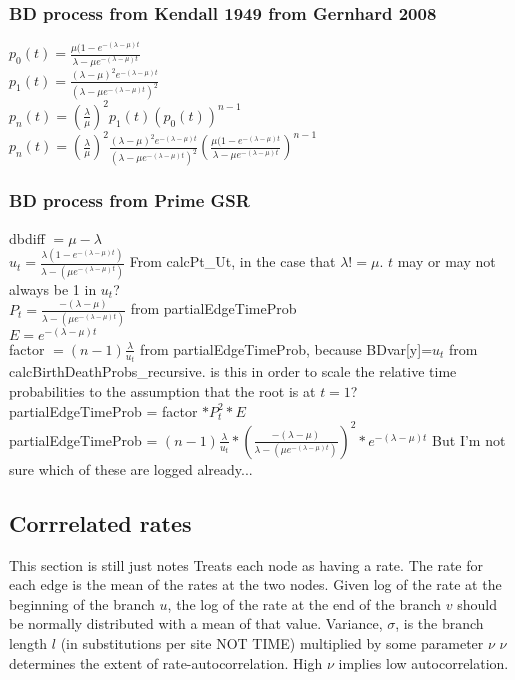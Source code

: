 \documentclass{llncs}
\newcommand{\ejmcomment}[1]{{\color{green} #1}}
\begin{document}
\subsubsection{BD process from Kendall 1949 from Gernhard 2008\\}

$p_0(t)=\frac{\mu(1-e^{-(\lambda-\mu)t}}{\lambda-\mu e^{-(\lambda-\mu)t}}$\\
$p_1(t)=\frac{(\lambda-\mu)^2e^{-(\lambda-\mu)t}}{(\lambda-\mu e^{-(\lambda-\mu)t})^2}$\\
$p_n(t)=(\frac{\lambda}{\mu})^2p_1(t)(p_0(t))^{n-1}$\\
$p_n(t)=(\frac{\lambda}{\mu})^2\frac{(\lambda-\mu)^2e^{-(\lambda-\mu)t}}{(\lambda-\mu e^{-(\lambda-\mu)t})^2}(\frac{\mu(1-e^{-(\lambda-\mu)t}}{\lambda-\mu e^{-(\lambda-\mu)t}})^{n-1}$\\

\subsubsection{BD process from Prime GSR\\}

dbdiff $= \mu - \lambda$\\
$u_t =\frac{\lambda(1-e^{-(\lambda-\mu)t})}{\lambda-(\mu e^{-(\lambda - \mu)t})}$ From calcPt\_Ut, in the case that $\lambda != \mu$. \ejmcomment{$t$ may or may not always be 1 in $u_t$?}\\
$P_t = \frac{-(\lambda-\mu)}{\lambda-(\mu e^{-(\lambda - \mu)t})}$ from partialEdgeTimeProb\\
$E=e^{-(\lambda-\mu)t}$\\
factor $= (n-1)\frac{\lambda}{u_t}$ from partialEdgeTimeProb, because BDvar[y]=$u_t$ from calcBirthDeathProbs\_recursive. 
\ejmcomment{is this in order to scale the relative time probabilities to the assumption that the root is at $t=1$?}\\
partialEdgeTimeProb = factor $*P_t^2 *E$\\
partialEdgeTimeProb = $(n-1)\frac{\lambda}{u_t} * ( \frac{-(\lambda-\mu)}{\lambda-(\mu e^{-(\lambda - \mu)t})})^2 * e^{-(\lambda-\mu)t}$\ejmcomment{But I'm not sure which of these are logged already...}\\

\subsection{Corrrelated rates \cite{Kishino2001}}\ejmcomment{This section is still just notes}
Treats each node as having a rate.
The rate for each edge is the mean of the rates at the two nodes.
Given log  of the rate at the beginning of the branch $u$, the log of the rate at the end of the branch $v$ should be normally distributed with a mean of that value.
Variance, $\sigma$, is the branch length $l$ (in substitutions per site NOT TIME) multiplied by some parameter $\nu$
$\nu$ determines the extent of rate-autocorrelation. High $\nu$ implies low autocorrelation. 
\end{document}
